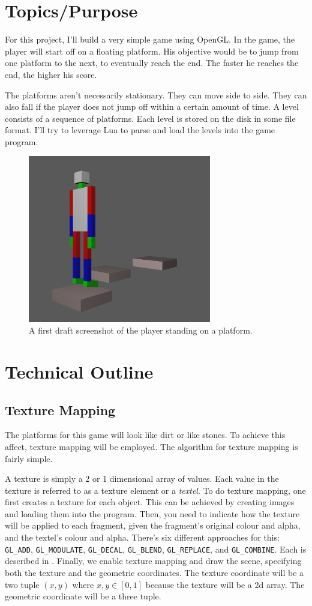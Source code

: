\documentclass[11pt]{article}
\begin{document}
\section*{Topics/Purpose}
For this project, I'll build a very simple game using OpenGL. In the game, the player will start off on a floating platform. His objective would be to jump from one platform to the next, to eventually reach the end. The faster he reaches the end, the higher his score.

The platforms aren't necessarily stationary. They can move side to side. They can also fall if the player does not jump off within a certain amount of time. A level consists of a sequence of platforms. Each level is stored on the disk in some file format. I'll try to leverage Lua to parse and load the levels into the game program.

\begin{figure}[H]
\includegraphics[width=8cm]{screenshot}
\centering
\caption{A first draft screenshot of the player standing on a platform.}
\end{figure}
\section*{Technical Outline}
\subsection*{Texture Mapping}
The platforms for this game will look like dirt or like stones. To achieve this affect, texture mapping will be employed. The algorithm for texture mapping is fairly simple.

A texture is simply a 2 or 1 dimensional array of values. Each value in the texture is referred to as a texture element or a \textit{textel}. To do texture mapping, one first creates a texture for each object. This can be achieved by creating images and loading them into the program. Then, you need to indicate how the texture will be applied to each fragment, given the fragment's original colour and alpha, and the textel's colour and alpha. There's six different approaches for this: \verb|GL_ADD|, \verb|GL_MODULATE|, \verb|GL_DECAL|, \verb|GL_BLEND|, \verb|GL_REPLACE|, and \verb|GL_COMBINE|. Each is described in \cite{texture-map-fn}. Finally, we enable texture mapping and draw the scene, specifying both the texture and the geometric coordinates. The texture coordinate will be a two tuple $(x, y)$ where $x,y \in [0, 1]$ because the texture will be a 2d array. The geometric coordinate will be a three tuple.
\end{document}
